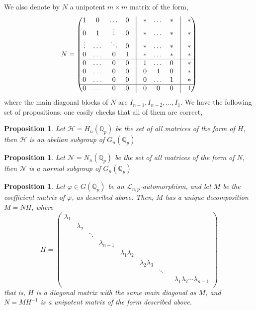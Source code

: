 \documentclass[12pt]{article}
\newtheorem{proposition}[theorem]{Proposition}
\begin{document}
We also denote by $N$ a unipotent $m\times m$ matrix of the form, \[N=\begin{pmatrix}
1 &0 &\dots &0 &\vline &* &\dots &* &\vline& *\\
0& 1 &\vdots &0 &\vline&* &\dots &* &\vline&*\\
\vdots& \dots& \ddots & 0&\vline& *& \dots& *&\vline & *\\
0& \dots& 0& 1&\vline & * & \dots & * &\vline & *\\
\hline
0&\dots &0 & 0& \vline &1&\dots &0&\vline&*\\
0&\dots &0 & 0& \vline & 0 & 1 & 0 &\vline &*\\
0&\dots &0 & 0& \vline & 0 & \dots & 1 &\vline &*\\
\hline
0&\dots &0 & 0& \vline & 0 & 0 & 0 &\vline &1\\
\end{pmatrix}
\]
where the main diagonal blocks of $N$ are $I_{n-1},I_{n-2},\dots,I_1$.
We have the following set of propositions, one easily checks that all of them are correct,
\begin{proposition}
\label{prop.automorphism.subgroup.h}
Let $\mathcal{H}=H_n(\mathbb{Q}_p)$ be the set of all matrices of the form of $H$, then $\mathcal{H}$ is an abelian subgroup of $G_n(\mathbb{Q}_p)$
\end{proposition}
\begin{proposition}
\label{prop.automorphism.subgroup.n}
Let $\mathcal{N}=N_n(\mathbb{Q}_p)$ be the set of all matrices of the form of $N$, then $\mathcal{N}$ is a normal subgroup of $G_n(\mathbb{Q}_p)$
\end{proposition}
\begin{proposition}
\label{prop.automorphism.matrix.decomposition}
Let $\varphi\in G(\mathbb{Q}_p)$ be an $\mathcal{L}_{n,p}$-automorphism, and let $M$ be the coefficient matrix of $\varphi$, as described above. Then, $M$ has a unique decomposition $M=NH$, where \[H=\begin{pmatrix}
\lambda_1 & & & & & & & & \\
 &\lambda_2 & & & & & & & \\
 & & \ddots & & & & & & \\
& & & \lambda_{n-1} & & & & & \\
& & & & \lambda_1\lambda_2 & & & & \\
 & & & & & \lambda_2\lambda_3 & & & \\
 & & & & & & \ddots & & \\
 & & & & & & & & \lambda_1\lambda_2\cdots\lambda_{n-1}\\
\end{pmatrix}
\]
that is, $H$ is a diagonal matrix with the same main diagonal as $M$, and $N=MH^{-1}$ is a unipotent matrix of the form described above.
\end{proposition}
\end{document}
